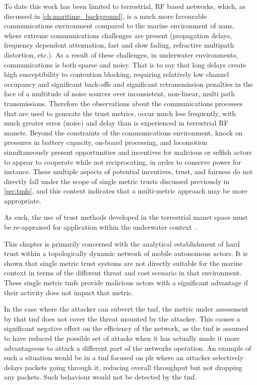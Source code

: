 To date this work has been limited to terrestrial, RF based networks, which, as discussed in \autoref{ch:maritime_background}, is a much more favourable communications environment compared to the marine environment of \glspl{uan}, where extreme communications challenges are present (propagation delays, frequency dependent attenuation, fast and slow fading, refractive multipath distortion, etc.).
As a result of these challenges, in underwater environments, communications is both sparse and noisy.
That is to say that long delays create high susceptibility to contention blocking, requiring relatively low channel occupancy and significant back-offs and significant retransmission penalties in the face of a multitude of noise sources over inconsistent, non-linear, multi path transmissions.
Therefore the observations about the communications processes that are used to generate the trust metrics, occur much less frequently, with much greater error (noise) and delay than is experienced in terrestrial RF \glspl{manet}.
Beyond the constraints of the communications environment, knock on pressures in battery capacity, on-board processing, and locomotion simultaneously present opportunities and incentives for malicious or selfish actors to appear to cooperate while not reciprocating, in order to conserve power for instance.
These multiple aspects of potential incentives, trust, and fairness do not directly fall under the scope of single metric trusts discussed previously in \autoref{sec:tmfs}, and this context indicates that a multi-metric approach may be more appropriate.

As such, the use of trust methods developed in the terrestrial \gls{manet} space must be re-appraised for application within the underwater context~\cite{Pavan2015}.

This chapter is primarily concerned with the analytical establishment of hard trust within a topologically dynamic network of mobile autonomous actors.
It is shown that single metric trust systems are not directly suitable for the marine context in terms of the different threat and cost scenario in that environment.
These single metric \glspl{tmf} provide malicious actors with a significant advantage if their activity does not impact that metric.

In the case where the attacker can subvert the \gls{tmf}, the metric under assessment by that \gls{tmf} does not cover the threat mounted by the attacker.
This causes a significant negative effect on the efficiency of the network, as the \gls{tmf} is assumed to have reduced the possible set of attacks when it has actually made it more advantageous to attack a different part of the networks operation.
An example of such a situation would be in a \gls{tmf} focused on \gls{plr} where an attacker selectively delays packets going through it, reducing overall throughput but not dropping any packets.
Such behaviour would not be detected by the \gls{tmf}.

